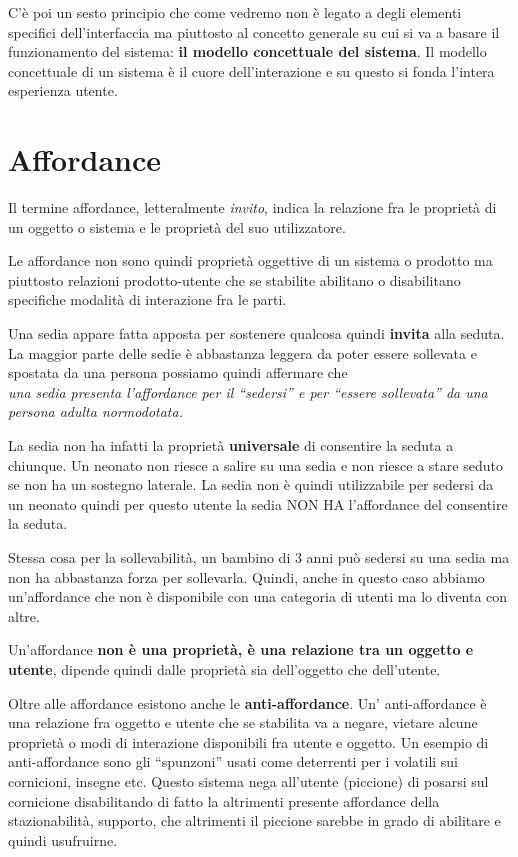 C'è poi un sesto principio che come vedremo non è legato a degli elementi specifici dell'interfaccia ma piuttosto al concetto generale su cui si va a basare il funzionamento del sistema: \textbf{il modello concettuale del sistema}. Il modello concettuale di un sistema è il cuore dell'interazione e su questo si fonda l'intera esperienza utente.

\section{Affordance}
Il termine affordance, letteralmente \textit{invito}, indica la relazione fra le proprietà di un oggetto o sistema e le proprietà del suo utilizzatore. 

Le affordance non sono quindi proprietà oggettive di un sistema o prodotto ma piuttosto relazioni prodotto-utente che se stabilite abilitano o disabilitano specifiche modalità di interazione fra le parti.

Una sedia appare fatta apposta per sostenere qualcosa quindi \textbf{invita} alla seduta. La maggior parte delle sedie è abbastanza leggera da poter essere sollevata e spostata da una persona possiamo quindi affermare che\\

\textit{una sedia presenta l'affordance per il ``sedersi'' e per ``essere sollevata'' da una persona adulta normodotata.}

La sedia non ha infatti la proprietà \textbf{universale} di consentire la seduta a chiunque. Un neonato non riesce a salire su una sedia e non riesce a stare seduto se non ha un sostegno laterale. La sedia non è quindi utilizzabile per sedersi da un neonato quindi per questo utente la sedia NON HA l'affordance del consentire la seduta.

Stessa cosa per la sollevabilità, un bambino di 3 anni può sedersi su una sedia ma non ha abbastanza forza per sollevarla. Quindi, anche in questo caso abbiamo un'affordance che non è disponibile con una categoria di utenti ma lo diventa con altre.

Un'affordance \textbf{non è una proprietà, è una relazione tra un oggetto e utente}, dipende quindi dalle proprietà sia dell'oggetto che dell'utente.

Oltre alle affordance esistono anche le \textbf{anti-affordance}. Un' anti-affordance è una relazione fra oggetto e utente che se stabilita va a negare, vietare alcune proprietà o modi di interazione disponibili fra utente e oggetto.
Un esempio di anti-affordance sono gli ``spunzoni'' usati come deterrenti per i volatili sui cornicioni, insegne etc. Questo sistema nega all'utente (piccione) di posarsi sul cornicione disabilitando di fatto la altrimenti presente affordance della stazionabilità, supporto, che altrimenti il piccione sarebbe in grado di abilitare e quindi usufruirne.


